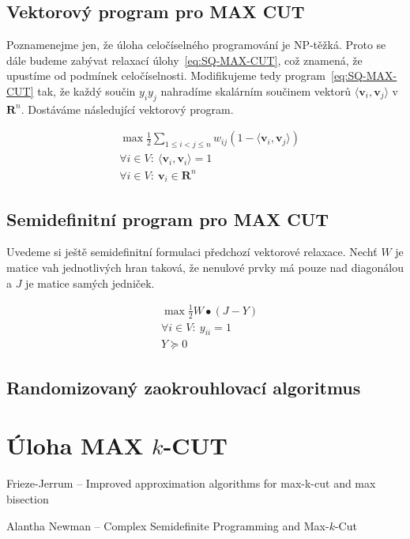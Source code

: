 \subsection*{Vektorový program pro MAX CUT}

Poznamenejme jen, že úloha celočíselného programování je NP-těžká. Proto se dále budeme zabývat relaxací úlohy~\ref{eq:SQ-MAX-CUT}, což znamená, že upustíme od podmínek celočíselnosti. Modifikujeme tedy program~\ref{eq:SQ-MAX-CUT} tak, že každý součin $y_i y_j$ nahradíme skalárním součinem vektorů $\langle \mathbf{v}_i, \mathbf{v}_j \rangle$ v $\mathbf{R}^n$. Dostáváme následující vektorový program.

\begin{equation}\tag{V-MAX-CUT}
    \begin{split}
        &\max \frac{1}{2} \sum_{1 \leq i < j \leq n} w_{ij} (1 - \langle \mathbf{v}_i, \mathbf{v}_j \rangle) \\
        &\forall i \in V:\ \langle \mathbf{v}_i, \mathbf{v}_i \rangle = 1 \\
        &\forall i \in V:\ \mathbf{v}_i \in \mathbf{R}^n
    \end{split}
    \label{eq:V-MAX-CUT}
\end{equation}


\subsection*{Semidefinitní program pro MAX CUT}

Uvedeme si ještě semidefinitní formulaci předchozí vektorové relaxace. Nechť $W$ je matice vah jednotlivých hran taková, že nenulové prvky má pouze nad diagonálou a $J$ je matice samých jedniček.

\begin{equation}\tag{SDP-MAX-CUT}
    \begin{split}
        &\max \frac{1}{2} W \bullet (J - Y) \\
        &\forall i \in V:\ y_{ii} = 1 \\
        &Y \succeq 0
    \end{split}
    \label{eq:SDP-MAX-CUT}
\end{equation}

\subsection*{Randomizovaný zaokrouhlovací algoritmus}


\section{Úloha MAX $k$-CUT}

\noindent Frieze-Jerrum -- Improved approximation algorithms for max-k-cut and max bisection

\noindent Alantha Newman -- Complex Semidefinite Programming and Max-$k$-Cut
